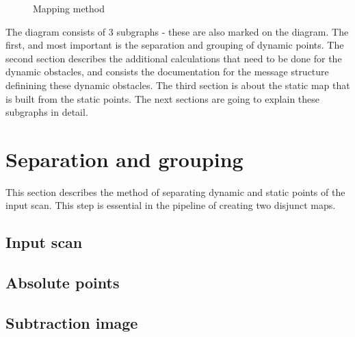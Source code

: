 \begin{figure}[!ht]
    \caption{Mapping method}
    \label{mapping_method}
\end{figure}

The diagram consists of 3 subgraphs - these are also marked on the diagram. The first, and most important is the separation and grouping of dynamic points. The second section describes the additional calculations that need to be done for the dynamic obstacles, and consists the documentation for the message structure definining these dynamic obstacles. The third section is about the static map that is built from the static points. The next sections are going to explain these subgraphs in detail.

\section{Separation and grouping}
This section describes the method of separating dynamic and static points of the input scan. This step is essential in the pipeline of creating two disjunct maps.

\subsection{Input scan}


\subsection{Absolute points}


\subsection{Subtraction image}


